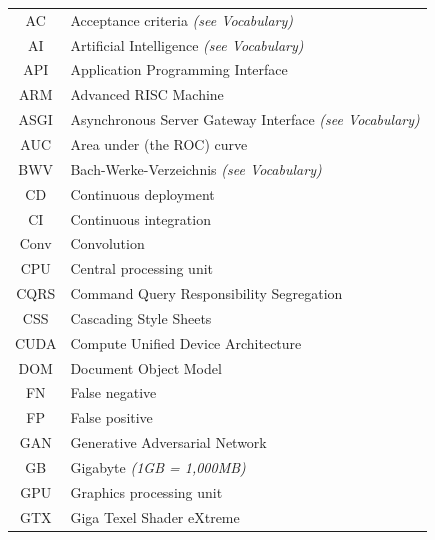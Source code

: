 \documentclass[a4paper, 11pt, twoside]{report}
\theoremstyle{definition}
\begin{document}
\begin{longtable}{cl}
    AC      & Acceptance criteria \textit{(see Vocabulary)}                   \\
    AI      & Artificial Intelligence \textit{(see Vocabulary)}               \\
    API     & Application Programming Interface                               \\
    ARM     & Advanced RISC Machine                                           \\
    ASGI    & Asynchronous Server Gateway Interface \textit{(see Vocabulary)} \\
    AUC     & Area under (the ROC) curve                                      \\
    BWV     & Bach-Werke-Verzeichnis \textit{(see Vocabulary)}                \\
    CD      & Continuous deployment                                           \\
    CI      & Continuous integration                                          \\
    Conv    & Convolution                                                     \\
    CPU     & Central processing unit                                         \\
    CQRS    & Command Query Responsibility Segregation                        \\
    CSS     & Cascading Style Sheets                                          \\
    CUDA    & Compute Unified Device Architecture                             \\
    DOM     & Document Object Model                                           \\
    FN      & False negative                                                  \\
    FP      & False positive                                                  \\
    GAN     & Generative Adversarial Network                                  \\
    GB      & Gigabyte \textit{(1GB = 1,000MB)}                               \\
    GPU     & Graphics processing unit                                        \\
    GTX     & Giga Texel Shader eXtreme                                       \\

\end{longtable}
\end{document}
